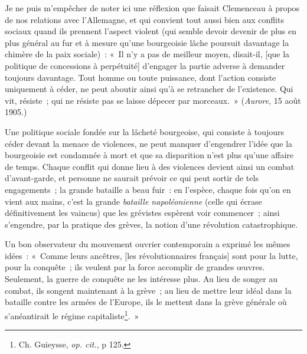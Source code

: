 \documentclass[french,twoside]{book} %
\begin{document}
\noindent Je ne puis m’empêcher de noter ici une réflexion que faisait Clemenceau à propos de nos relations avec l’Allemagne, et qui convient tout aussi bien aux conflits sociaux quand ils prennent l’aspect violent (qui semble devoir devenir de plus en plus général au fur et à mesure qu’une bourgeoisie lâche poursuit davantage la chimère de la paix sociale) : « Il n’y a pas de meilleur moyen, disait-il, [que la politique de concessions à perpétuité] d’engager la partie adverse à demander toujours davantage. Tout homme ou toute puissance, dont l’action consiste uniquement à céder, ne peut aboutir ainsi qu’à se retrancher de l’existence. Qui vit, résiste ; qui ne résiste pas se laisse dépecer par morceaux. » (\emph{Aurore}, 15 août 1905.)\par
Une politique sociale fondée sur la lâcheté bourgeoise, qui consiste à toujours céder devant la menace de violences, ne peut manquer d’engendrer l’idée que la bourgeoisie  est condamnée à mort et que sa disparition n’est plus qu’une affaire de temps. Chaque conflit qui donne lieu à des violences devient ainsi un combat d’avant-garde, et personne ne saurait prévoir ce qui peut sortir de tels engagements ; la grande bataille a beau fuir : en l’espèce, chaque fois qu’on en vient aux mains, c’est la grande \emph{bataille napoléonienne} (celle qui écrase définitivement les vaincus) que les grévistes espèrent voir commencer ; ainsi s’engendre, par la pratique des grèves, la notion d’une révolution catastrophique.\par
Un bon observateur du mouvement ouvrier contemporain a exprimé les mêmes idées : « Comme leurs ancêtres, [les révolutionnaires français] sont pour la lutte, pour la conquête ; ils veulent par la force accomplir de grandes œuvres. Seulement, la guerre de conquête ne les intéresse plus. Au lieu de songer au combat, ils songent maintenant à la grève ; au lieu de mettre leur idéal dans la bataille contre les armées de l’Europe, ils le mettent dans la grève générale où s’anéantirait le régime capitaliste\footnote{ \noindent Ch. Guieysse, \emph{op. cit.}, p 125.
 }. »\par
\end{document}
